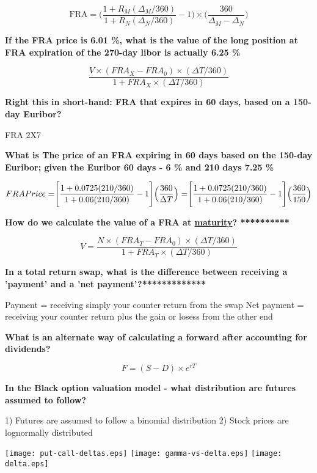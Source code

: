 \documentclass[12pt]{article}
\begin{document}
$$
\text{FRA} = \Biggr(  \dfrac{1 + R_M ( \Delta_M/ 360)}{1 + R_N ( \Delta_N/ 360)} - 1 \Biggr) \times \Biggr( \dfrac{360}{\Delta_M - \Delta_N }\Biggl)
$$

\textbf{If the FRA price is 6.01 \%, what is the value of the long position at FRA expiration of the 270-day libor is actually 6.25 \% }

$$
\dfrac{V \times (FRA_X - FRA_0) \times (\Delta T / 360)}{1 + FRA_X \times  (\Delta T / 360) }
$$

\textbf{Right this in short-hand: FRA that expires in 60 days, based on a 150-day Euribor?}

FRA 2X7 

\textbf{What is The price of an FRA expiring in 60 days based on the 150-day Euribor; given the Euribor 60 days - 6 \% and 210 days 7.25 \% }

$$
FRA Price = \Biggr[  \dfrac{1 + 0.0725 (210/360) }{ 1 + 0.06 (210/360) } - 1\Biggl] \Bigl( \dfrac{360}{\Delta T} \Bigr) \\
= \Biggr[  \dfrac{1 + 0.0725 (210/360) }{ 1 + 0.06 (210/360) } - 1\Biggl] \Bigl( \dfrac{360}{150} \Bigr) 
$$

\textbf{How do we calculate the value of a FRA at \underline{maturity}? ********** }


$$
V = \dfrac{N \times (FRA_T - FRA_0) \times (\Delta T/360)}{1 + FRA_T \times (\Delta T/360)}
$$

\textbf{In a total return swap, what is the difference between receiving a 'payment' and a 'net payment'?*************}

Payment = receiving simply your counter return from the swap
Net payment = receiving your counter return plus the gain or losess from the other end



\textbf{What is an alternate way of calculating a forward after accounting for dividends?}

$$
F = (S - D) \times e^{rT	}
$$
\begin{framed}
	
	\textbf{In the Black option valuation model - what distribution are futures assumed to follow?}
	
	1) Futures are assumed to follow a binomial distribution
	2) Stock prices are lognormally distributed
	
\end{framed}

\texttt{[image: put-call-deltas.eps]}{}
\texttt{[image: gamma-vs-delta.eps]}{}
\texttt{[image: delta.eps]}{}
\end{document}
